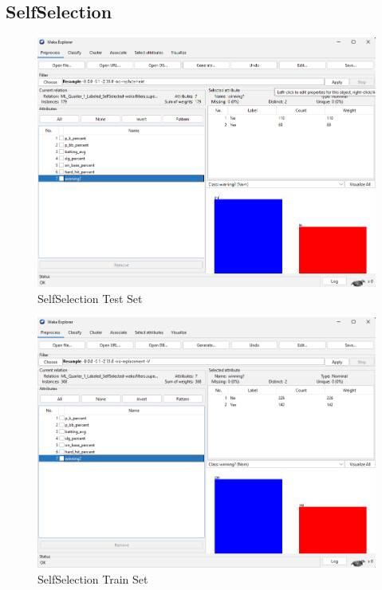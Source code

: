 \documentclass[12pt]{article}
\begin{document}
\newpage
\subsection{SelfSelection}
\begin{figure}[h!]
    \includegraphics[scale=0.4]{./images/SelfSelected/TestSet.png}
\centering
    \caption{SelfSelection Test Set}
    \label{fig:SSTest}
\end{figure}
\begin{figure}[h!]
    \includegraphics[scale=0.4]{./images/SelfSelected/TrainSet.png}
\centering
    \caption{SelfSelection Train Set}
    \label{fig:SSTrain}
\end{figure}

\newpage
\end{document}

